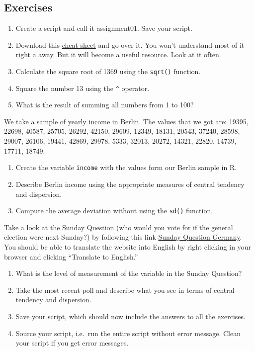 \documentclass[]{book}
\providecommand{\tightlist}{%
  \setlength{\itemsep}{0pt}\setlength{\parskip}{0pt}}
\theoremstyle{definition}
\theoremstyle{definition}
\theoremstyle{definition}
\theoremstyle{remark}
\begin{document}
\subsection{Exercises}\label{exercises}

\begin{enumerate}
\def\labelenumi{\arabic{enumi}.}
\tightlist
\item
  Create a script and call it assignment01. Save your script.
\item
  Download this
  \href{https://www.rstudio.com/wp-content/uploads/2016/06/r-cheat-sheet.pdf}{cheat-sheet}
  and go over it. You won't understand most of it right a away. But it
  will become a useful resource. Look at it often.
\item
  Calculate the square root of 1369 using the \texttt{sqrt()} function.
\item
  Square the number 13 using the \texttt{\^{}} operator.
\item
  What is the result of summing all numbers from 1 to 100?
\end{enumerate}

We take a sample of yearly income in Berlin. The values that we got are:
19395, 22698, 40587, 25705, 26292, 42150, 29609, 12349, 18131, 20543,
37240, 28598, 29007, 26106, 19441, 42869, 29978, 5333, 32013, 20272,
14321, 22820, 14739, 17711, 18749.

\begin{enumerate}
\def\labelenumi{\arabic{enumi}.}
\setcounter{enumi}{5}
\tightlist
\item
  Create the variable \texttt{income} with the values form our Berlin
  sample in R.
\item
  Describe Berlin income using the appropriate measures of central
  tendency and dispersion.
\item
  Compute the average deviation without using the \texttt{sd()}
  function.
\end{enumerate}

Take a look at the Sunday Question (who would you vote for if the
general election were next Sunday?) by following this link
\href{https://www.wahlrecht.de/umfragen/}{Sunday Question Germany}. You
should be able to translate the website into English by right clicking
in your browser and clicking ``Translate to English.''

\begin{enumerate}
\def\labelenumi{\arabic{enumi}.}
\setcounter{enumi}{8}
\tightlist
\item
  What is the level of measurement of the variable in the Sunday
  Question?
\item
  Take the most recent poll and describe what you see in terms of
  central tendency and dispersion.
\item
  Save your script, which should now include the answers to all the
  exercises.
\item
  Source your script, i.e.~run the entire script without error message.
  Clean your script if you get error messages.
\end{enumerate}
\end{document}
